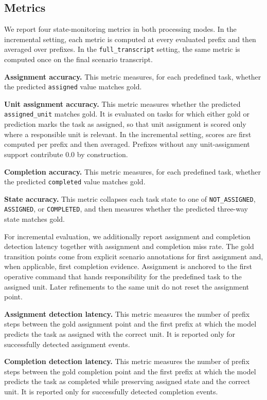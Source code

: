 \subsection{Metrics}

We report four state-monitoring metrics in both processing modes. In the incremental setting, each metric is computed at every evaluated prefix and then averaged over prefixes. In the \texttt{full\_transcript} setting, the same metric is computed once on the final scenario transcript.

\textbf{Assignment accuracy.} This metric measures, for each predefined task, whether the predicted \texttt{assigned} value matches gold.

\textbf{Unit assignment accuracy.} This metric measures whether the predicted \texttt{assigned\_unit} matches gold. It is evaluated on tasks for which either gold or prediction marks the task as assigned, so that unit assignment is scored only where a responsible unit is relevant. In the incremental setting, scores are first computed per prefix and then averaged. Prefixes without any unit-assignment support contribute 0.0 by construction.

\textbf{Completion accuracy.} This metric measures, for each predefined task, whether the predicted \texttt{completed} value matches gold.

\textbf{State accuracy.} This metric collapses each task state to one of \texttt{NOT\_ASSIGNED}, \texttt{ASSIGNED}, or \texttt{COMPLETED}, and then measures whether the predicted three-way state matches gold.

For incremental evaluation, we additionally report assignment and completion detection latency together with assignment and completion miss rate. The gold transition points come from explicit scenario annotations for first assignment and, when applicable, first completion evidence. Assignment is anchored to the first operative command that hands responsibility for the predefined task to the assigned unit. Later refinements to the same unit do not reset the assignment point.

\textbf{Assignment detection latency.} This metric measures the number of prefix steps between the gold assignment point and the first prefix at which the model predicts the task as assigned with the correct unit. It is reported only for successfully detected assignment events.

\textbf{Completion detection latency.} This metric measures the number of prefix steps between the gold completion point and the first prefix at which the model predicts the task as completed while preserving assigned state and the correct unit. It is reported only for successfully detected completion events.

